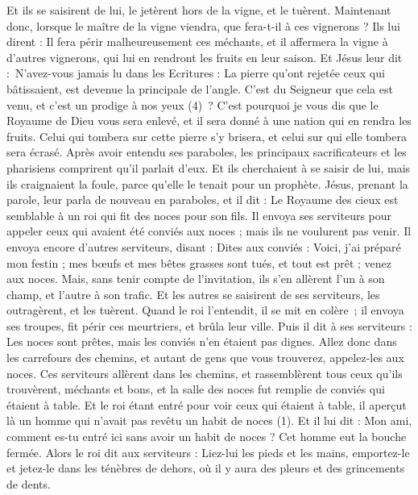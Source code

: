 \begin{multicols}{2}
{Et ils se saisirent de lui, le jetèrent hors de la vigne, et le tuèrent.
Maintenant donc, lorsque le maître de la vigne viendra, que fera-t-il à ces vignerons ?
Ils lui dirent : Il fera périr malheureusement ces méchants, et il affermera la vigne à d'autres vignerons, qui lui en rendront les fruits en leur saison.
Et Jésus leur dit : N'avez-vous jamais lu dans les Ecritures : La pierre qu’ont rejetée ceux qui bâtissaient, est devenue la principale de l’angle. C’est du Seigneur que cela est venu, et c’est un prodige à nos yeux (4) ?
C'est pourquoi je vous dis que le Royaume de Dieu vous sera enlevé, et il sera donné à une nation qui en rendra les fruits.
Celui qui tombera sur cette pierre s’y brisera, et celui sur qui elle tombera sera écrasé.
Après avoir entendu ses paraboles, les principaux sacrificateurs et les pharisiens comprirent qu'il parlait d'eux.
Et ils cherchaient à se saisir de lui, mais ils craignaient la foule, parce qu’elle le tenait pour un prophète.
\VerseOne{}Jésus, prenant la parole, leur parla de nouveau en paraboles, et il dit :
Le Royaume des cieux est semblable à un roi qui fit des noces pour son fils.
Il envoya ses serviteurs pour appeler ceux qui avaient été conviés aux noces ; mais ils ne voulurent pas venir.
Il envoya encore d'autres serviteurs, disant : Dites aux conviés : Voici, j'ai préparé mon festin ; mes bœufs et mes bêtes grasses sont tués, et tout est prêt ; venez aux noces.
Mais, sans tenir compte de l’invitation, ils s’en allèrent l'un à son champ, et l'autre à son trafic.
Et les autres se saisirent de ses serviteurs, les outragèrent, et les tuèrent.
Quand le roi l'entendit, il se mit en colère ; il envoya ses troupes, fit périr ces meurtriers, et brûla leur ville.
Puis il dit à ses serviteurs : Les noces sont prêtes, mais les conviés n’en étaient pas dignes.
Allez donc dans les carrefours des chemins, et autant de gens que vous trouverez, appelez-les aux noces.
Ces serviteurs allèrent dans les chemins, et rassemblèrent tous ceux qu'ils trouvèrent, méchants et bons, et la salle des noces fut remplie de conviés qui étaient à table.
Et le roi étant entré pour voir ceux qui étaient à table, il aperçut là un homme qui n’avait pas revêtu un habit de noces (1).
Et il lui dit : Mon ami, comment es-tu entré ici sans avoir un habit de noces ? Cet homme eut la bouche fermée.
Alors le roi dit aux serviteurs : Liez-lui les pieds et les mains, emportez-le et jetez-le dans les ténèbres de dehors, où il y aura des pleurs et des grincements de dents.
}
\end{multicols}
